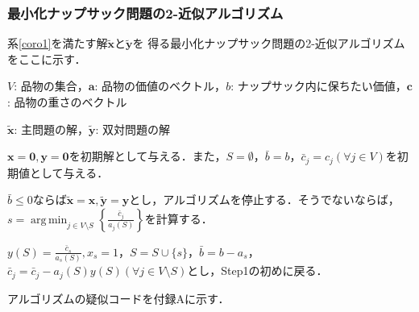\documentclass[11pt,dvipdfmx]{jarticle}
\DeclareMathOperator*{\argmin}{arg\,min}
\numberwithin{equation}{section}
\begin{document}
        \subsubsection{最小化ナップサック問題の2-近似アルゴリズム\cite{apx_des}}
            系\ref{coro1}を満たす解$\tilde{\bm{x}}$と$\tilde{\bm{y}}$を
            得る最小化ナップサック問題の2-近似アルゴリズムをここに示す．\par
            \begin{description}
                \setlength{\leftskip}{0.5cm}
                \setlength{\rightskip}{1.0cm}
                \item[Algorithm\ref{mkp_alg}]
                \item[Input:] $V$: 品物の集合，$\bm{a}$: 品物の価値のベクトル，$b$: ナップサック内に保ちたい価値，$\bm{c}$: 品物の重さのベクトル
                \item[Output:] $\tilde{\bm{x}}$: 主問題の解，$\tilde{\bm{y}}$: 双対問題の解
                \item[Step0:] $\bm{x}=\bm{0},\bm{y}=\bm{0}$を初期解として与える．また，$S = \emptyset$，$\bar{b}=b$，$\bar{c}_j=c_j(\forall j\in V)$を初期値として与える．
                \item[Step1:] $\bar{b}\le0$ならば$\tilde{\bm{x}}=\bm{x},\tilde{\bm{y}}=\bm{y}$とし，アルゴリズムを停止する．そうでないならば，$s=\displaystyle\argmin_{j\in V\setminus S}\left\{\frac{\bar{c}_j}{a_j(S)}\right\}$を計算する．
                \item[Step2:] $y(S)=\displaystyle\frac{\bar{c}_s}{a_s(S)}, x_s=1$，$S=S\cup \{s\}$，$\bar{b}=b-a_s$，$\bar{c}_j=\bar{c}_j-a_j(S)y(S)(\forall j\in V\setminus S)$とし，Step1の初めに戻る．
            \end{description}

            アルゴリズムの疑似コードを付録Aに示す．
\end{document}
